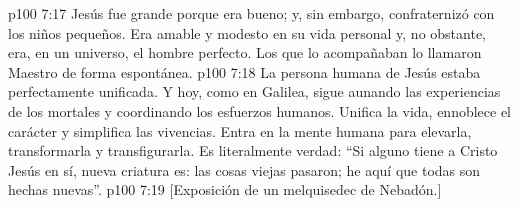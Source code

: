 \vs p100 7:17 Jesús fue grande porque era bueno; y, sin embargo, confraternizó con los niños pequeños. Era amable y modesto en su vida personal y, no obstante, era, en un universo, el hombre perfecto. Los que lo acompañaban lo llamaron Maestro de forma espontánea.
\vs p100 7:18 La persona humana de Jesús estaba perfectamente unificada. Y hoy, como en Galilea, sigue aunando las experiencias de los mortales y coordinando los esfuerzos humanos. Unifica la vida, ennoblece el carácter y simplifica las vivencias. Entra en la mente humana para elevarla, transformarla y transfigurarla. Es literalmente verdad: “Si alguno tiene a Cristo Jesús en sí, nueva criatura es: las cosas viejas pasaron; he aquí que todas son hechas nuevas”.
\vsetoff
\vs p100 7:19 [Exposición de un melquisedec de Nebadón.]
